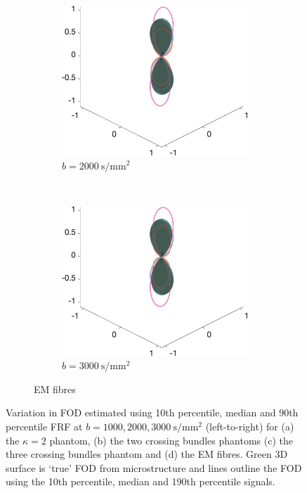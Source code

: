 \begin{figure}
\begin{subfigure}[]{\textwidth}
\begin{subfigure}[]{0.32\textwidth}
    \includegraphics[width=\textwidth]{figures/frf_experiment/EMfibres_fod_3D_b_2000n_4}
    \caption*{$b=\SI{2000}{\second\per\milli\metre\squared}$}
  \end{subfigure}
  ~
  \begin{subfigure}[]{0.32\textwidth}
    \includegraphics[width=\textwidth]{figures/frf_experiment/EMfibres_fod_3D_b_3000n_4}
    \caption*{$b=\SI{3000}{\second\per\milli\metre\squared}$}
  \end{subfigure}
  \caption{EM fibres}
  \end{subfigure}
  \caption[Variation in \acs{FOD} estimated at $b = 1000,2000,\SI{3000}{\second\per\milli\metre\squared}$]{Variation in \ac{FOD} estimated using 10th percentile, median and 90th percentile \ac{FRF} at $b = 1000,2000,\SI{3000}{\second\per\milli\metre\squared}$ (left-to-right) for (a) the $\kappa=2$ phantom, (b) the two crossing bundles phantoms  (c) the three crossing bundles phantom and (d) the EM fibres. Green 3D surface is `true' \ac{FOD} from microstructure and lines outline the \ac{FOD} using the 10th percentile, median and 190th percentile signals. }
  \label{fig:frf_fod_b123}
\end{figure}

